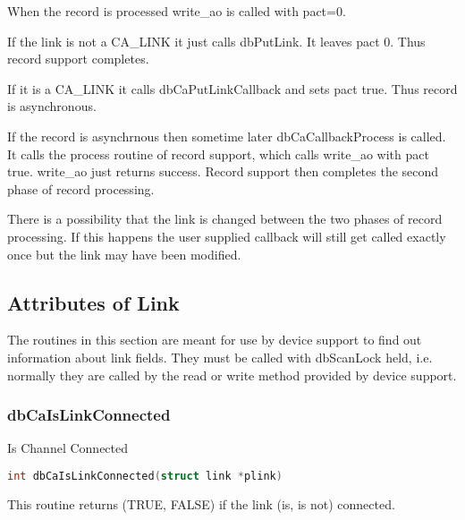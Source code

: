 \begin{description}

\item When the record is processed write\_ao is called with pact=0.

\begin{description}

\item If the link is not a CA\_LINK it just calls dbPutLink.
It leaves pact 0.
Thus record support completes.

\item If it is a CA\_LINK it calls dbCaPutLinkCallback and sets pact true.
Thus record is asynchronous.

\end{description}

\item If the record is asynchrnous then sometime later dbCaCallbackProcess is called.
It calls the process routine of record support, which calls write\_ao with pact true.
write\_ao just returns success.
Record support then completes the second phase of record processing.

\end{description}

There is a possibility that the link is changed between the two phases of record processing.
If this happens the user supplied callback will still get called exactly once but the link may have been modified.

\subsection{Attributes of Link}

The routines in this section are meant for use by device support to find out information about link fields.
They must be called with dbScanLock held, i.e. normally they are called by the read or write method provided by device support.

\subsubsection{dbCaIsLinkConnected}

Is Channel Connected

\begin{lstlisting}[language=C]
int dbCaIsLinkConnected(struct link *plink)
\end{lstlisting}

This routine returns (TRUE, FALSE) if the link (is, is not) connected.

